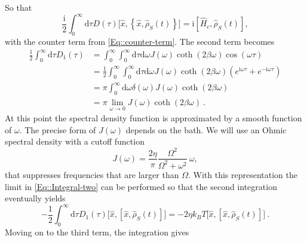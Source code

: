 	So that
	\begin{equation}
		\frac{\mathrm{i}}{2} \int_0^\infty \text{d}\tau D(\tau) \Big[\hat{x}, \left\{\hat{x}, \hat{\rho}_S(t)\right\} \Big] =	\mathrm{i} \left[\hat{H}_c, \hat{\rho}_S(t)\right],
	\end{equation}
	with the counter term from \eqref{Eq::counter-term}. The second term becomes
	\begin{equation} \label{Eq::Integral-two}
		\begin{split}
			\frac{1}{2} \int_{0}^{\infty} \text{d}\tau D_1(\tau) &=	\int_{0}^{\infty} \int_0^\infty \text{d}\tau  \text{d} \omega J(\omega) \coth \left(2\beta \omega\right) \cos \left(\omega \tau \right) \\
			&= \frac{1}{2}	\int_{0}^{\infty} \int_0^\infty \text{d}\tau  \text{d} \omega J(\omega) \coth \left(2\beta \omega\right) \left( e^{\mathrm{i} \omega \tau} + e^{-\mathrm{i} \omega \tau} \right) \\
			&= \pi \int_0^\infty \text{d} \omega \delta(\omega) J(\omega) \coth \left(2\beta \omega\right) \\
			&=	\pi \lim_{\omega \rightarrow 0} J(\omega) \coth \left(2\beta \omega\right)~.
		\end{split}
	\end{equation}
	At this point the spectral density function is approximated by a smooth function of $\omega$. The precise form of $J(\omega)$ depends on the bath. We will use an Ohmic spectral density with a cutoff function
	\begin{equation} \label{Eq::smooth-J}
		J(\omega) = \frac{2 \eta}{\pi}	\frac{ \Omega^2}{\Omega^2 + \omega^2} ~\omega,
	\end{equation}
	that suppresses frequencies that are larger than $\Omega$. With this representation the limit in \eqref{Eq::Integral-two} can be performed so that the second integration eventually yields
	\begin{equation} \label{Eq::fluctuation-term}
		-\frac{1}{2} \int_{0}^{\infty} \text{d}\tau D_1(\tau) \Big[\hat{x}, \left[{\hat{x}} , \hat{\rho}_S(t)\right]\Big] =	-2 \eta k_B T \Big[\hat{x}, \left[{\hat{x}} , \hat{\rho}_S(t)\right]\Big]~.
	\end{equation}
 	Moving on to the third term, the integration gives
